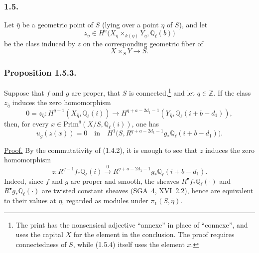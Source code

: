 \subsubsection*{1.5.}
Let $\bar\eta$ be a geometric point of $S$ (lying over a point $\eta$ of
$S$), and let
\begin{equation}\tag{1.5.1}
z_{\bar\eta}\in
H^a\bigl(X_{\bar\eta}\times_{k(\bar\eta)}Y_{\bar\eta},
\mathbb Q_\ell(b)\bigr)
\end{equation}
be the class induced by $z$ on the corresponding geometric fiber of
\begin{equation}\tag{1.5.2}
X\times_S Y\longrightarrow S.
\end{equation}

\subsubsection*{Proposition 1.5.3.}
Suppose that $f$ and $g$ are proper, that $S$ is connected,\footnote{The
print has the nonsensical adjective ``annexe'' in place of ``connexe'', and
uses the capital $X$ for the element in the conclusion.  The proof requires
connectedness of $S$, while (1.5.4) itself uses the element $x$.} and let
$q\in\mathbb Z$.  If the class $z_{\bar\eta}$ induces the zero
homomorphism
\begin{equation}\tag{1.5.3}
0=z_{\bar\eta}:H^{q-1}(X_{\bar\eta},\mathbb Q_\ell(i))
\longrightarrow
H^{q+a-2d_1-1}(Y_{\bar\eta},\mathbb Q_\ell(i+b-d_1)),
\end{equation}
then, for every
$x\in\mathrm{Prim}^q(X/S,\mathbb Q_\ell(i))$, one has
\begin{equation}\tag{1.5.4}
u_g(z(x))=0\quad\text{in}\quad
H^1\bigl(S,R^{q+a-2d_1-1}g_*\mathbb Q_\ell(i+b-d_1)\bigr).
\end{equation}

\noindent\underline{Proof.}
By the commutativity of (1.4.2), it is enough to see that $z$ induces the
zero homomorphism
\begin{equation}\tag{1.5.5}
z:R^{q-1}f_*\mathbb Q_\ell(i)
\stackrel{0}{\longrightarrow}
R^{q+a-2d_1-1}g_*\mathbb Q_\ell(i+b-d_1).
\end{equation}
Indeed, since $f$ and $g$ are proper and smooth, the sheaves
$R^\bullet f_*\mathbb Q_\ell(\mathord\cdot)$ and
$R^\bullet g_*\mathbb Q_\ell(\mathord\cdot)$ are twisted constant sheaves
(SGA~4, XVI~2.2), hence are equivalent to their values at $\bar\eta$,
regarded as modules under $\pi_1(S,\bar\eta)$.

